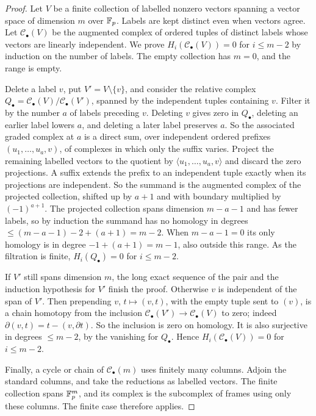 \begin{proof}
Let $V$ be a finite collection of labelled nonzero vectors spanning a vector space of dimension $m$ over $\mathbb F_p$. Labels
are kept distinct even when vectors agree. Let $\mathcal C_\bullet(V)$ be the augmented complex of ordered tuples of
distinct labels whose vectors are linearly independent. We prove $H_i(\mathcal C_\bullet(V))=0$ for $i\leq m-2$ by
induction on the number of labels. The empty collection has $m=0$, and the range is empty.

Delete a label $v$, put $V'=V\setminus\{v\}$, and consider the relative complex
$Q_\bullet=\mathcal C_\bullet(V)/\mathcal C_\bullet(V')$, spanned by the independent tuples containing $v$. Filter it by
the number $a$ of labels preceding $v$. Deleting $v$ gives zero in $Q_\bullet$, deleting an earlier label lowers $a$, and
deleting a later label preserves $a$. So the associated graded complex at $a$ is a direct sum, over independent ordered
prefixes $(u_1,\dots,u_a,v)$, of complexes in which only the suffix varies. Project the remaining labelled vectors to
the quotient by $\langle u_1,\dots,u_a,v\rangle$ and discard the zero projections. A suffix extends the prefix to an
independent tuple exactly when its projections are independent. So the summand is the augmented complex of the
projected collection, shifted up by $a+1$ and with boundary multiplied by $(-1)^{a+1}$. The projected collection spans
dimension $m-a-1$ and has fewer labels, so by induction the summand has no homology in degrees
$\leq(m-a-1)-2+(a+1)=m-2$. When $m-a-1=0$ its only homology is in degree $-1+(a+1)=m-1$, also outside this range. As the
filtration is finite, $H_i(Q_\bullet)=0$ for $i\leq m-2$.

If $V'$ still spans dimension $m$, the long exact sequence of the pair and the induction hypothesis for $V'$ finish the
proof. Otherwise $v$ is independent of the span of $V'$. Then prepending $v$, $t\mapsto(v,t)$, with the empty tuple sent
to $(v)$, is a chain homotopy from the inclusion $\mathcal C_\bullet(V')\to\mathcal C_\bullet(V)$ to zero; indeed
$\partial(v,t)=t-(v,\partial t)$. So the inclusion is zero on homology. It is also surjective in degrees $\leq m-2$, by the
vanishing for $Q_\bullet$. Hence $H_i(\mathcal C_\bullet(V))=0$ for $i\leq m-2$.

Finally, a cycle or chain of $\mathcal C_\bullet(m)$ uses finitely many columns. Adjoin the standard columns, and take
the reductions as labelled vectors. The finite collection spans $\mathbb F_p^m$, and its complex is the subcomplex of frames
using only these columns. The finite case therefore applies.
\end{proof}

